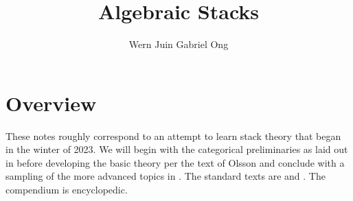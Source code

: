 \documentclass{amsart}
\theoremstyle{definition}
\numberwithin{equation}{section}
\begin{document}
\large
\title[Algebraic Stacks]{Algebraic Stacks}
\author{Wern Juin Gabriel Ong}
\address{Bowdoin College, Brunswick, Maine 04011}
\maketitle
\section*{Overview}
These notes roughly correspond to an attempt to learn stack theory that began in the winter of 2023. We will begin with the categorical preliminaries as laid out in \cite{Vistoli} before developing the basic theory per the text of Olsson \cite{Olsson} and conclude with a sampling of the more advanced topics in \cite[Part 7]{stacks-project}. The standard texts are \cite{LaumonMoret-Bailly} and \cite{Olsson}. The compendium \cite{stacks-project} is encyclopedic. 
\tableofcontents
\newpage
















\printbibliography
\end{document}
